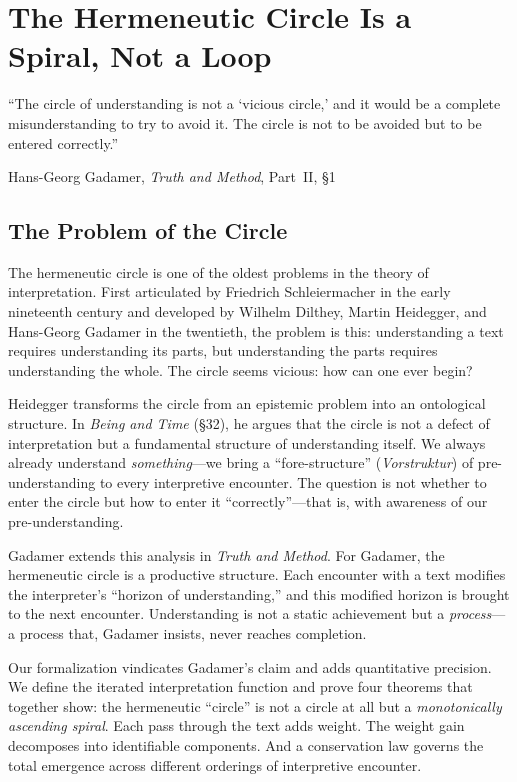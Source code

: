 \chapter{The Hermeneutic Circle Is a Spiral, Not a Loop}
\label{ch:hermeneutic-spiral}

\epigraph{``The circle of understanding is not a `vicious circle,' and
it would be a complete misunderstanding to try to avoid it. The circle
is not to be avoided but to be entered correctly.''}
{Hans-Georg Gadamer, \textit{Truth and Method}, Part~II, \S1}

\section{The Problem of the Circle}

The hermeneutic circle is one of the oldest problems in the theory of
interpretation. First articulated by Friedrich Schleiermacher in the
early nineteenth century and developed by Wilhelm Dilthey, Martin
Heidegger, and Hans-Georg Gadamer in the twentieth, the problem is
this: understanding a text requires understanding its parts, but
understanding the parts requires understanding the whole. The circle
seems vicious: how can one ever begin?

Heidegger transforms the circle from an epistemic problem into an
ontological structure. In \textit{Being and Time} (\S32), he argues
that the circle is not a defect of interpretation but a fundamental
structure of understanding itself. We always already understand
\emph{something}---we bring a ``fore-structure'' (\textit{Vorstruktur})
of pre-understanding to every interpretive encounter. The question is
not whether to enter the circle but how to enter it ``correctly''---that
is, with awareness of our pre-understanding.

Gadamer extends this analysis in \textit{Truth and Method}. For
Gadamer, the hermeneutic circle is a productive structure. Each
encounter with a text modifies the interpreter's ``horizon of
understanding,'' and this modified horizon is brought to the next
encounter. Understanding is not a static achievement but a
\emph{process}---a process that, Gadamer insists, never reaches
completion.

Our formalization vindicates Gadamer's claim and adds quantitative
precision. We define the iterated interpretation function and prove four
theorems that together show: the hermeneutic ``circle'' is not a circle
at all but a \emph{monotonically ascending spiral}. Each pass through
the text adds weight. The weight gain decomposes into identifiable
components. And a conservation law governs the total emergence across
different orderings of interpretive encounter.

